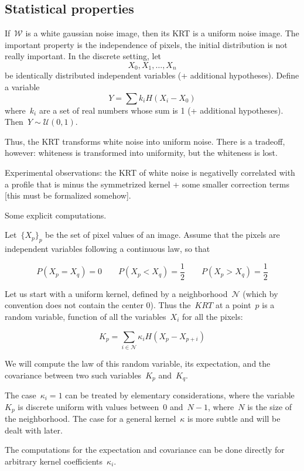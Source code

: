 \documentclass[12pt]{article}                  %
\begin{document}
\subsection{Statistical properties}

If~$\mathcal{W}$ is a white gaussian noise image, then its KRT is a uniform
noise image.  The important property is the independence of pixels, the
initial distribution is not really important.  In the discrete setting, let
\[
	X_0,X_1,\ldots,X_n
\]
be identically distributed independent variables (+ additional hypotheses).
Define a variable
\[
	Y = \sum k_i H(X_i-X_0)
\]
where~$k_i$ are a set of real numbers whose sum is 1 (+ additional
hypotheses).  Then~$Y\sim\mathcal{U}(0,1)$.

Thus, the KRT transforms white noise into uniform noise.  There is a
tradeoff, however: whiteness is transformed into uniformity, but the
whiteness is lost.

Experimental observations: the KRT of white noise is negativelly correlated
with a profile that is minus the symmetrized kernel + some smaller
correction terms [this must be formalized somehow].

\bigskip

Some explicit computations.

Let~$\{X_p\}_p$ be the set of pixel values of an image.  Assume that the
pixels are independent variables following a continuous law, so that

$$
P(X_p=X_q)=0
\qquad
P(X_p<X_q)=\frac12
\qquad
P(X_p>X_q)=\frac12
$$

Let us start with a uniform kernel, defined by a neighborhood~$\mathcal{N}$
(which by convention does not contain the center 0).
Thus the~$KRT$ at a point~$p$ is a random variable, function of all the
variables~$X_i$ for all the pixels:

\[
	K_p = \sum_{i\in\mathcal{N}} \kappa_i H(X_p - X_{p+i})
\]

We will compute the law of this random variable, its expectation, and the
covariance between two such variables~$K_p$ and~$K_q$.

The case~$\kappa_i=1$ can be treated by elementary considerations, where the
variable~$K_p$ is discrete uniform with values between~$0$ and~$N-1$,
where~$N$ is the size of the neighborhood.
The case for a general kernel~$\kappa$ is more subtle and will be dealt with
later.

The computations for the expectation and covariance can be done directly for
arbitrary kernel coefficients~$\kappa_i$.
\end{document}
